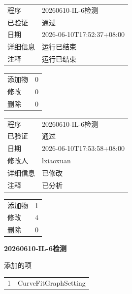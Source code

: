 \documentclass[UTF8,10pt,a4paper,fontset=fandol]{ctexart}
\begin{document}
\begin{flushleft}
\vspace{0.75em}

\begin{tabular}{@{}ll}
程序 & 20260610-IL-6检测\\
已验证 & 通过\\
日期 & 2026-06-10T17:52:37+08:00\\
详细信息 & 运行已结束\\
注释 & 运行已结束\\
\end{tabular}

\vspace{0.5em}

\begin{tabular}{@{}ll}
添加物 & 0\\
修改 & 0\\
删除 & 0
\end{tabular}

\vspace{0.75em}

\begin{tabular}{@{}ll}
程序 & 20260610-IL-6检测\\
已验证 & 通过\\
日期 & 2026-06-10T17:53:58+08:00\\
修改人 & lxiaoxuan\\
详细信息 & 已修改\\
注释 & 已分析\\
\end{tabular}

\vspace{0.5em}

\begin{tabular}{@{}ll}
添加物 & 1\\
修改 & 4\\
删除 & 0
\end{tabular}

\end{flushleft}

\newpage

\noindent\textbf{20260610-IL-6检测}

\vspace{0.5em}

\noindent 添加的项

\begin{tabular}{p{0.5cm}p{5cm}}
1 & CurveFitGraphSetting
\end{tabular}

\vspace{0.5em}
\end{document}
